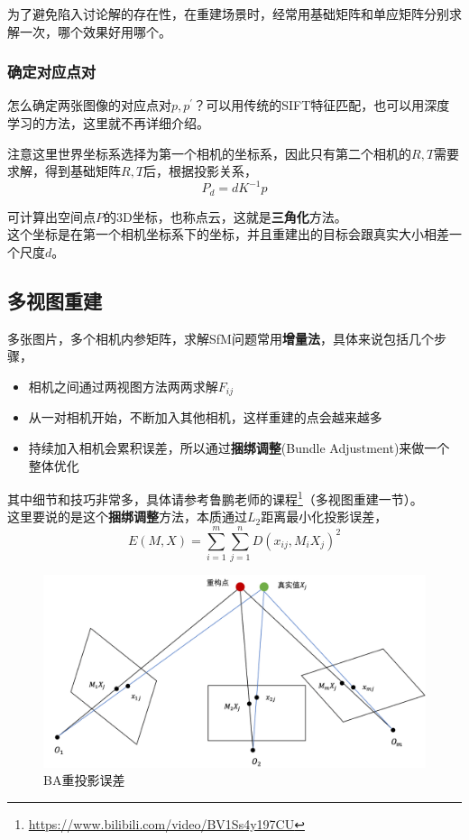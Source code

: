 		为了避免陷入讨论解的存在性，在重建场景时，经常用基础矩阵和单应矩阵分别求解一次，哪个效果好用哪个。

	\subsubsection*{确定对应点对}
		怎么确定两张图像的对应点对$p,p^{\prime}$？可以用传统的SIFT特征匹配，也可以用深度学习的方法，这里就不再详细介绍。

	
	注意这里世界坐标系选择为第一个相机的坐标系，因此只有第二个相机的$R,T$需要求解，得到基础矩阵$R,T$后，根据投影关系，
	$$
		P_d = dK^{-1}p
	$$

	可计算出空间点$P$的3D坐标，也称点云，这就是\textbf{三角化}方法。\\

	这个坐标是在第一个相机坐标系下的坐标，并且重建出的目标会跟真实大小相差一个尺度$d$。

	\subsection{多视图重建}
		多张图片，多个相机内参矩阵，求解SfM问题常用\textbf{增量法}，具体来说包括几个步骤，
	
	\begin{itemize}
		\item 相机之间通过两视图方法两两求解$F_{ij}$
		\item 从一对相机开始，不断加入其他相机，这样重建的点会越来越多
		\item 持续加入相机会累积误差，所以通过\textbf{捆绑调整}(Bundle Adjustment)来做一个整体优化
	\end{itemize}

	其中细节和技巧非常多，具体请参考鲁鹏老师的课程\footnote{\url{https://www.bilibili.com/video/BV1Ss4y197CU}}（多视图重建一节）。\\

	这里要说的是这个\textbf{捆绑调整}方法，本质通过$L_2$距离最小化投影误差，
	$$
		E(M,X) = \sum_{i=1}^m \sum_{j=1}^n D\left(x_{ij}, M_iX_j\right)^2
	$$

	\begin{figure}[H]
		\begin{center}
			\includegraphics[width=\textwidth]{../images/ba.png}
		\end{center}
		\caption{BA重投影误差}
	\end{figure}

